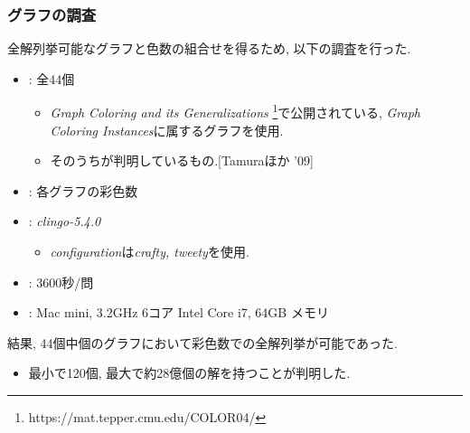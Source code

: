 \documentclass[dvipdfmx,11pt]{beamer}
\begin{document}
\begin{frame}\frametitle{グラフの調査}
  全解列挙可能なグラフと色数の組合せを得るため, 以下の調査を行った.
  \begin{itemize}
    \item {}: 全44個
    \begin{itemize}
      \item \textit{Graph Coloring and its Generalizations}
      \footnote{https://mat.tepper.cmu.edu/COLOR04/}で公開されている, \textit{Graph Coloring Instances}に属するグラフを使用.
      \item そのうちが判明しているもの.[Tamuraほか '09]
    \end{itemize}
    \item {}: 各グラフの彩色数

    \item {}: \textit{clingo-5.4.0}
      \begin{itemize}
        \item \textit{configuration}は\textit{crafty, tweety}を使用.
      \end{itemize}
    \item {}: 3600秒/問
    \item {}: Mac mini, 3.2GHz 6コア Intel Core i7, 64GB メモリ
  \end{itemize}


  \begin{alertblock}{}
    結果, 44個中個のグラフにおいて彩色数での全解列挙が可能であった.
    \begin{itemize}
      \item 最小で120個, 最大で約28億個の解を持つことが判明した.
    \end{itemize}
  \end{alertblock}
  
  
\end{frame}

\end{document}
